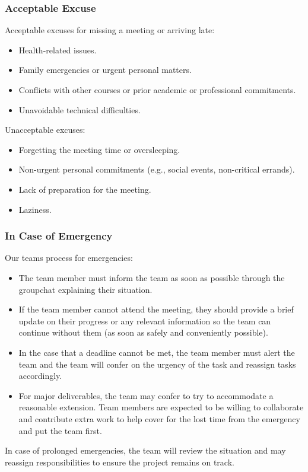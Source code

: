 \documentclass{article}
\begin{document}
\subsubsection*{Acceptable Excuse}

Acceptable excuses for missing a meeting or arriving late:
\begin{itemize}
    \item Health-related issues.
    \item Family emergencies or urgent personal matters.
    \item Conflicts with other courses or prior academic or professional commitments.
    \item Unavoidable technical difficulties.
\end{itemize}
Unacceptable excuses:
\begin{itemize}
    \item Forgetting the meeting time or oversleeping.
    \item Non-urgent personal commitments (e.g., social events, non-critical errands).
    \item Lack of preparation for the meeting.
    \item Laziness.
\end{itemize}

\subsubsection*{In Case of Emergency}

Our teams process for emergencies:
\begin{itemize}
    \item The team member must inform the team as soon as possible through the groupchat explaining their situation.
    \item If the team member cannot attend the meeting, they should provide a brief update on their progress or any relevant information so the team can continue without them (as soon as safely and conveniently possible).
    \item In the case that a deadline cannot be met, the team member must alert the team and the team will confer on the urgency of the task and reassign tasks accordingly.
    \item For major deliverables, the team may confer to try to accommodate a reasonable extension. Team members are expected to be willing to collaborate and contribute extra work to help cover for the lost time from the emergency and put the team first.
    
\end{itemize}
In case of prolonged emergencies, the team will review the situation and may reassign responsibilities to ensure the project remains on track.
\end{document}

